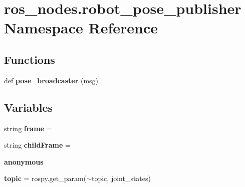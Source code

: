 \hypertarget{namespaceros__nodes_1_1robot__pose__publisher}{}\section{ros\+\_\+nodes.\+robot\+\_\+pose\+\_\+publisher Namespace Reference}
\label{namespaceros__nodes_1_1robot__pose__publisher}
\subsection*{Functions}
\begin{DoxyCompactItemize}
\item 
def {\bfseries pose\+\_\+broadcaster} (msg)\hypertarget{namespaceros__nodes_1_1robot__pose__publisher_a9fd7a7e5aaababb08300b54a8f8a7013}{}\label{namespaceros__nodes_1_1robot__pose__publisher_a9fd7a7e5aaababb08300b54a8f8a7013}

\end{DoxyCompactItemize}
\subsection*{Variables}
\begin{DoxyCompactItemize}
\item 
string {\bfseries frame} = \textquotesingle{}\textquotesingle{}\hypertarget{namespaceros__nodes_1_1robot__pose__publisher_a51f3b2383fdd0799cc94cf2e5137c876}{}\label{namespaceros__nodes_1_1robot__pose__publisher_a51f3b2383fdd0799cc94cf2e5137c876}

\item 
string {\bfseries child\+Frame} = \textquotesingle{}\textquotesingle{}\hypertarget{namespaceros__nodes_1_1robot__pose__publisher_af6631d2726dab181a55bb2e1a2284da5}{}\label{namespaceros__nodes_1_1robot__pose__publisher_af6631d2726dab181a55bb2e1a2284da5}

\item 
{\bfseries anonymous}\hypertarget{namespaceros__nodes_1_1robot__pose__publisher_a70d30175e0e903168b8723bf408cb7c3}{}\label{namespaceros__nodes_1_1robot__pose__publisher_a70d30175e0e903168b8723bf408cb7c3}

\item 
{\bfseries topic} = rospy.\+get\+\_\+param(\textquotesingle{}$\sim$topic\textquotesingle{}, \textquotesingle{}joint\+\_\+states\textquotesingle{})\hypertarget{namespaceros__nodes_1_1robot__pose__publisher_a9e2efb017469efdb0b2d76edc8790c6b}{}\label{namespaceros__nodes_1_1robot__pose__publisher_a9e2efb017469efdb0b2d76edc8790c6b}

\end{DoxyCompactItemize}


